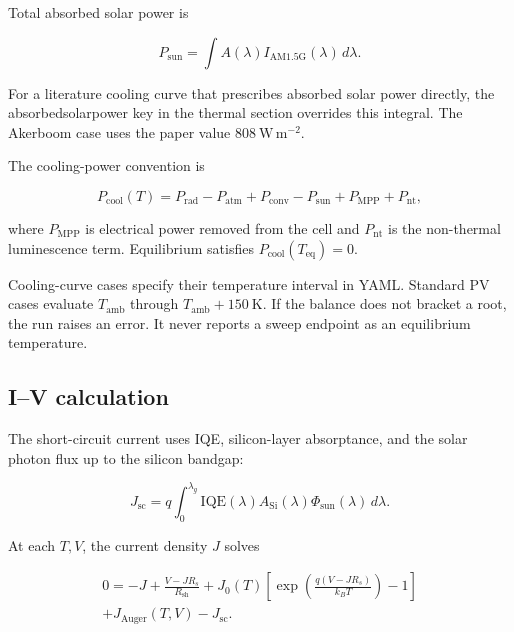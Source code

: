 \documentclass[11pt,a4paper,twoside]{article}
\DeclareRobustCommand{\code}[1]{\begingroup\upshape\ttfamily
  \def\_{\allowbreak\textunderscore\allowbreak}#1\endgroup}
\begin{document}
Total absorbed solar power is

\begin{equation}
P_{\mathrm{sun}}=\int A(\lambda)I_{\mathrm{AM1.5G}}(\lambda)\,d\lambda.
\end{equation}

\begin{sloppypar}
For a literature cooling curve that prescribes absorbed solar power directly,
the \code{absorbed\_solar\_power} key in the \code{thermal} section overrides
this integral. The Akerboom case uses the paper value
\(808~\mathrm{W\,m^{-2}}\).
\end{sloppypar}

The cooling-power convention is

\begin{equation}
P_{\mathrm{cool}}(T)=
P_{\mathrm{rad}}-P_{\mathrm{atm}}+P_{\mathrm{conv}}-P_{\mathrm{sun}}
+P_{\mathrm{MPP}}+P_{\mathrm{nt}},
\end{equation}

where \(P_{\mathrm{MPP}}\) is electrical power removed from the cell and
\(P_{\mathrm{nt}}\) is the non-thermal luminescence term. Equilibrium satisfies
\(P_{\mathrm{cool}}(T_{\mathrm{eq}})=0\).

Cooling-curve cases specify their temperature interval in YAML. Standard PV
cases evaluate \(T_{\mathrm{amb}}\) through \(T_{\mathrm{amb}}+150~\mathrm{K}\).
If the balance does not bracket a root, the run raises an error. It never
reports a sweep endpoint as an equilibrium temperature.

\subsection{I--V calculation}
\label{sec:ivcalc}

The short-circuit current uses IQE, silicon-layer absorptance, and the solar
photon flux up to the silicon bandgap:

\begin{equation}
J_{\mathrm{sc}}=q\int_0^{\lambda_g}
\mathrm{IQE}(\lambda)A_{\mathrm{Si}}(\lambda)
\Phi_{\mathrm{sun}}(\lambda)\,d\lambda.
\end{equation}

At each \(T,V\), the current density \(J\) solves

\begin{multline}
0=-J+\frac{V-JR_s}{R_{\mathrm{sh}}}
+J_0(T)\left[
\exp\left(\frac{q(V-JR_s)}{k_BT}\right)-1\right]\\
+J_{\mathrm{Auger}}(T,V)-J_{\mathrm{sc}}.
\end{multline}
\end{document}
